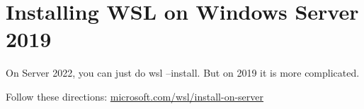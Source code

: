 \documentclass{article}
\begin{document}
\section{Installing WSL on Windows Server 2019}
On Server 2022, you can just do wsl --install. But on 2019 it is more complicated. 

Follow these directions: \href{https://learn.microsoft.com/en-us/windows/wsl/install-on-server}{microsoft.com/wsl/install-on-server}
\end{document}
